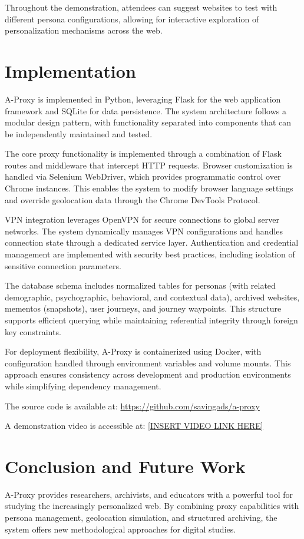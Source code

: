 \documentclass[sigconf]{acmart}
\begin{document}
Throughout the demonstration, attendees can suggest websites to test with different persona configurations, allowing for interactive exploration of personalization mechanisms across the web.

\section{Implementation}
A-Proxy is implemented in Python, leveraging Flask for the web application framework and SQLite for data persistence. The system architecture follows a modular design pattern, with functionality separated into components that can be independently maintained and tested.

The core proxy functionality is implemented through a combination of Flask routes and middleware that intercept HTTP requests. Browser customization is handled via Selenium WebDriver, which provides programmatic control over Chrome instances. This enables the system to modify browser language settings and override geolocation data through the Chrome DevTools Protocol.

VPN integration leverages OpenVPN for secure connections to global server networks. The system dynamically manages VPN configurations and handles connection state through a dedicated service layer. Authentication and credential management are implemented with security best practices, including isolation of sensitive connection parameters.

The database schema includes normalized tables for personas (with related demographic, psychographic, behavioral, and contextual data), archived websites, mementos (snapshots), user journeys, and journey waypoints. This structure supports efficient querying while maintaining referential integrity through foreign key constraints.

For deployment flexibility, A-Proxy is containerized using Docker, with configuration handled through environment variables and volume mounts. This approach ensures consistency across development and production environments while simplifying dependency management.

The source code is available at: \url{https://github.com/savingads/a-proxy}

A demonstration video is accessible at: \url{[INSERT VIDEO LINK HERE]}

\section{Conclusion and Future Work}
A-Proxy provides researchers, archivists, and educators with a powerful tool for studying the increasingly personalized web. By combining proxy capabilities with persona management, geolocation simulation, and structured archiving, the system offers new methodological approaches for digital studies.
\end{document}
